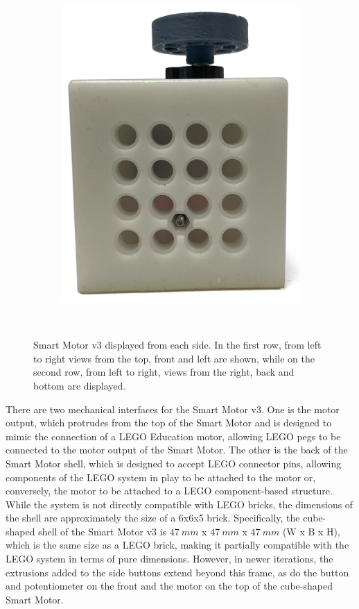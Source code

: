 \begin{figure}[H]
\begin{subfigure}[b]{0.25\textwidth}
        \includegraphics[width=\linewidth]{overleaf/images/back.png}
    \end{subfigure}
    \\\vspace{\ftspace}
    \caption{Smart Motor v3 displayed from each side. In the first row, from left to right views from the top, front and left are shown, while on the second row, from left to right, views from the right, back and bottom are displayed.}
    \vspace{\ftspace}
    \label{fig:smv3_hardware}
\end{figure}

There are two mechanical interfaces for the Smart Motor v3. One is the motor output, which protrudes from the top of the Smart Motor and is designed to mimic the connection of a LEGO Education motor, allowing LEGO pegs to be connected to the motor output of the Smart Motor. The other is the back of the Smart Motor shell, which is designed to accept LEGO connector pins, allowing components of the LEGO system in play to be attached to the motor or, conversely, the motor to be attached to a LEGO component-based structure. While the system is not directly compatible with LEGO bricks, the dimensions of the shell are approximately the size of a 6x6x5 brick. Specifically, the cube-shaped shell of the Smart Motor v3 is $47\ mm$ x $47\ mm$ x $47\ mm$ (W x B x H), which is the same size as a LEGO brick, making it partially compatible with the LEGO system in terms of pure dimensions. However, in newer iterations, the extrusions added to the side buttons extend beyond this frame, as do the button and potentiometer on the front and the motor on the top of the cube-shaped Smart Motor.

